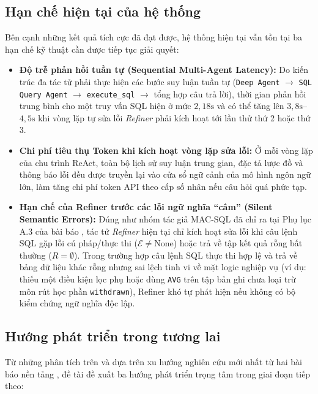 \documentclass[12pt,a4paper]{report}
\begin{document}
\subsection{Hạn chế hiện tại của hệ thống}

Bên cạnh những kết quả tích cực đã đạt được, hệ thống hiện tại vẫn tồn tại ba hạn chế kỹ thuật cần được tiếp tục giải quyết:
\begin{itemize}
    \item \textbf{Độ trễ phản hồi tuần tự (Sequential Multi-Agent Latency):} Do kiến trúc đa tác tử phải thực hiện các bước suy luận tuần tự (\texttt{Deep Agent} $\rightarrow$ \texttt{SQL Query Agent} $\rightarrow$ \texttt{execute\_sql} $\rightarrow$ tổng hợp câu trả lời), thời gian phản hồi trung bình cho một truy vấn SQL hiện ở mức $2{,}18\text{s}$ và có thể tăng lên $3{,}8\text{s}$--$4{,}5\text{s}$ khi vòng lặp tự sửa lỗi \textit{Refiner} phải kích hoạt tới lần thử thứ 2 hoặc thứ 3.
    \item \textbf{Chi phí tiêu thụ Token khi kích hoạt vòng lặp sửa lỗi:} Ở mỗi vòng lặp của chu trình ReAct, toàn bộ lịch sử suy luận trung gian, đặc tả lược đồ và thông báo lỗi đều được truyền lại vào cửa sổ ngữ cảnh của mô hình ngôn ngữ lớn, làm tăng chi phí token API theo cấp số nhân nếu câu hỏi quá phức tạp.
    \item \textbf{Hạn chế của Refiner trước các lỗi ngữ nghĩa ``câm'' (Silent Semantic Errors):} Đúng như nhóm tác giả MAC-SQL đã chỉ ra tại Phụ lục A.3 của bài báo \cite{wang2025macsql}, tác tử \textit{Refiner} hiện tại chỉ kích hoạt sửa lỗi khi câu lệnh SQL gặp lỗi cú pháp/thực thi ($\mathcal{E} \neq \text{None}$) hoặc trả về tập kết quả rỗng bất thường ($R = \emptyset$). Trong trường hợp câu lệnh SQL thực thi hợp lệ và trả về bảng dữ liệu khác rỗng nhưng sai lệch tinh vi về mặt logic nghiệp vụ (ví dụ: thiếu một điều kiện lọc phụ hoặc dùng \texttt{AVG} trên tập bản ghi chưa loại trừ môn rút học phần \texttt{withdrawn}), Refiner khó tự phát hiện nếu không có bộ kiểm chứng ngữ nghĩa độc lập.
\end{itemize}

\subsection{Hướng phát triển trong tương lai}

Từ những phân tích trên và dựa trên xu hướng nghiên cứu mới nhất từ hai bài báo nền tảng \cite{wang2025macsql, chen2025enterprise}, đề tài đề xuất ba hướng phát triển trọng tâm trong giai đoạn tiếp theo:
\end{document}
